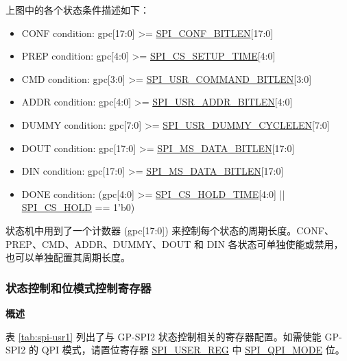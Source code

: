 \documentclass[main\_\_CN.tex]{subfiles}
\begin{document}
上图中的各个状态条件描述如下：
\begin{itemize}
    \item CONF condition: gpc[17:0] >= \hyperref[fielddesc:SPICONFBITLEN]{SPI\_CONF\_BITLEN}[17:0]
    \item PREP condition: gpc[4:0] >= \hyperref[fielddesc:SPICSSETUPTIME]{SPI\_CS\_SETUP\_TIME}[4:0]
    \item CMD condition: gpc[3:0] >= \hyperref[fielddesc:SPIUSRCOMMANDBITLEN]{SPI\_USR\_COMMAND\_BITLEN}[3:0]
    \item ADDR condition: gpc[4:0] >= \hyperref[fielddesc:SPIUSRADDRBITLEN]{SPI\_USR\_ADDR\_BITLEN}[4:0]
    \item DUMMY condition: gpc[7:0] >= \hyperref[fielddesc:SPIUSRDUMMYCYCLELEN]{SPI\_USR\_DUMMY\_CYCLELEN}[7:0]
    \item DOUT condition: gpc[17:0] >= \hyperref[fielddesc:SPIMSDATABITLEN]{SPI\_MS\_DATA\_BITLEN}[17:0]
    \item DIN condition: gpc[17:0] >= \hyperref[fielddesc:SPIMSDATABITLEN]{SPI\_MS\_DATA\_BITLEN}[17:0]

    \item DONE condition: (gpc[4:0] >= \hyperref[fielddesc:SPICSHOLDTIME]{SPI\_CS\_HOLD\_TIME}[4:0] || \hyperref[fielddesc:SPICSHOLD]{SPI\_CS\_HOLD} == 1'b0)

\end{itemize}





状态机中用到了一个计数器 (gpc[17:0]) 来控制每个状态的周期长度。CONF、PREP、CMD、ADDR、DUMMY、DOUT 和 DIN 各状态可单独使能或禁用，也可以单独配置其周期长度。

\subsubsection{状态控制和位模式控制寄存器} \label{sec:gp-spi2-state-and-register-configuration}

\textbf{概述}

表  \ref{tab:spi-usr1} 列出了与 GP-SPI2 状态控制相关的寄存器配置。如需使能 GP-SPI2 的 QPI 模式，请置位寄存器 \hyperref[regdesc:SPIUSERREG]{SPI\_USER\_REG} 中 \hyperref[fielddesc:SPIQPIMODE]{SPI\_QPI\_MODE} 位。
\end{document}
